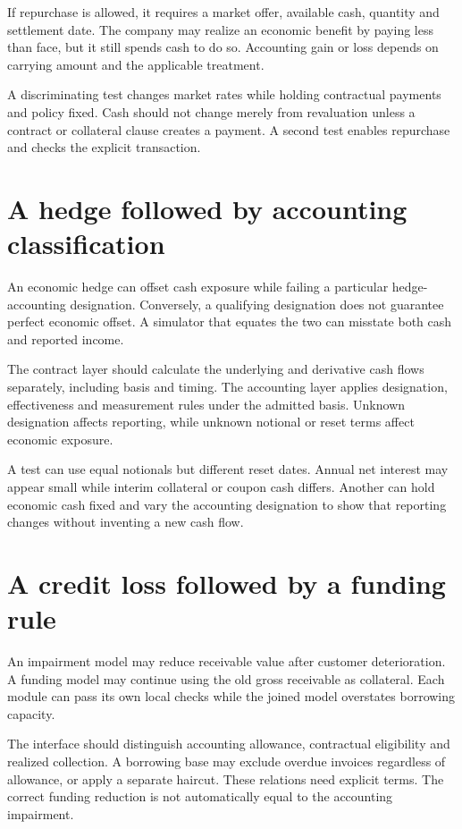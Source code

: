 If repurchase is allowed, it requires a market offer, available cash, quantity and settlement date. The company may realize an economic benefit by paying less than face, but it still spends cash to do so. Accounting gain or loss depends on carrying amount and the applicable treatment.

A discriminating test changes market rates while holding contractual payments and policy fixed. Cash should not change merely from revaluation unless a contract or collateral clause creates a payment. A second test enables repurchase and checks the explicit transaction.

\section{A hedge followed by accounting classification}
An economic hedge can offset cash exposure while failing a particular hedge-accounting designation. Conversely, a qualifying designation does not guarantee perfect economic offset. A simulator that equates the two can misstate both cash and reported income.

The contract layer should calculate the underlying and derivative cash flows separately, including basis and timing. The accounting layer applies designation, effectiveness and measurement rules under the admitted basis. Unknown designation affects reporting, while unknown notional or reset terms affect economic exposure.

A test can use equal notionals but different reset dates. Annual net interest may appear small while interim collateral or coupon cash differs. Another can hold economic cash fixed and vary the accounting designation to show that reporting changes without inventing a new cash flow.

\section{A credit loss followed by a funding rule}
An impairment model may reduce receivable value after customer deterioration. A funding model may continue using the old gross receivable as collateral. Each module can pass its own local checks while the joined model overstates borrowing capacity.

The interface should distinguish accounting allowance, contractual eligibility and realized collection. A borrowing base may exclude overdue invoices regardless of allowance, or apply a separate haircut. These relations need explicit terms. The correct funding reduction is not automatically equal to the accounting impairment.

